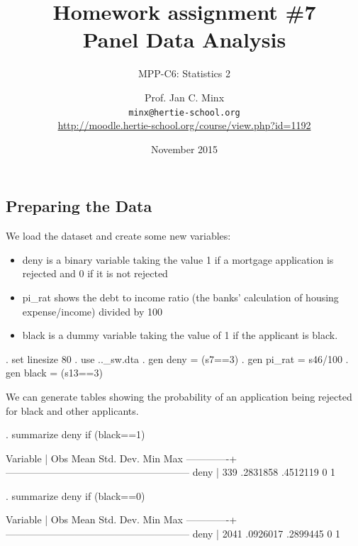 \documentclass{scrartcl}
\begin{document}
	\title{Homework assignment \#7\\ Panel Data Analysis}
	\subtitle{MPP-C6: Statistics 2}
	\author{Prof. Jan C. Minx\\ \texttt{minx@hertie-school.org} \\
		\url{http://moodle.hertie-school.org/course/view.php?id=1192}}
	\date{November 2015}
	
	\maketitle
	
\subsection{Preparing the Data}

We load the dataset and create some new variables:

\begin{itemize}
\item deny is a binary variable taking the value 1 if a mortgage application is rejected and 0 if it is not rejected
\item pi\_rat shows the debt to income ratio (the banks' calculation of housing expense/income) divided by 100
\item black is a dummy variable taking the value of 1 if the applicant is black.
\end{itemize}


\begin{SinputC}
. set linesize 80
. use ..\stata\hmda_sw.dta
. gen deny = (s7==3)
. gen pi_rat = s46/100
. gen black = (s13==3)
\end{SinputC}

We can generate tables showing the probability of an application being rejected for black and other applicants.

\begin{SinputC}
. summarize deny if (black==1)
\end{SinputC}
\begin{SoutputC}
    Variable |       Obs        Mean    Std. Dev.       Min        Max
-------------+--------------------------------------------------------
        deny |       339    .2831858    .4512119          0          1
\end{SoutputC}

\begin{SinputC}
. summarize deny if (black==0)
\end{SinputC}
\begin{SoutputC}
    Variable |       Obs        Mean    Std. Dev.       Min        Max
-------------+--------------------------------------------------------
        deny |      2041    .0926017    .2899445          0          1
\end{SoutputC}
\end{document}

